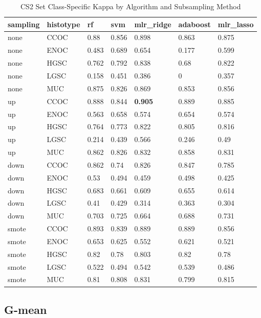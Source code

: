 \documentclass[
]{report}
\begin{document}
\begin{table}

\caption{\label{tab:cs2-kappa-class-table}CS2 Set Class-Specific Kappa by Algorithm and Subsampling Method}
\centering
\begin{tabular}[t]{l|l|l|l|l|l|l}
\hline
sampling & histotype & rf & svm & mlr\_ridge & adaboost & mlr\_lasso\\
\hline
none & CCOC & 0.88 & 0.856 & 0.898 & 0.863 & 0.875\\
\hline
none & ENOC & 0.483 & 0.689 & 0.654 & 0.177 & 0.599\\
\hline
none & HGSC & 0.762 & 0.792 & 0.838 & 0.68 & 0.822\\
\hline
none & LGSC & 0.158 & 0.451 & 0.386 & 0 & 0.357\\
\hline
none & MUC & 0.875 & 0.826 & 0.869 & 0.853 & 0.856\\
\hline
up & CCOC & 0.888 & 0.844 & \textbf{0.905} & 0.889 & 0.885\\
\hline
up & ENOC & 0.563 & 0.658 & 0.574 & 0.654 & 0.574\\
\hline
up & HGSC & 0.764 & 0.773 & 0.822 & 0.805 & 0.816\\
\hline
up & LGSC & 0.214 & 0.439 & 0.566 & 0.246 & 0.49\\
\hline
up & MUC & 0.862 & 0.826 & 0.832 & 0.858 & 0.831\\
\hline
down & CCOC & 0.862 & 0.74 & 0.826 & 0.847 & 0.785\\
\hline
down & ENOC & 0.53 & 0.494 & 0.459 & 0.498 & 0.425\\
\hline
down & HGSC & 0.683 & 0.661 & 0.609 & 0.655 & 0.614\\
\hline
down & LGSC & 0.41 & 0.429 & 0.314 & 0.363 & 0.304\\
\hline
down & MUC & 0.703 & 0.725 & 0.664 & 0.688 & 0.731\\
\hline
smote & CCOC & 0.893 & 0.839 & 0.889 & 0.889 & 0.856\\
\hline
smote & ENOC & 0.653 & 0.625 & 0.552 & 0.621 & 0.521\\
\hline
smote & HGSC & 0.82 & 0.78 & 0.803 & 0.82 & 0.78\\
\hline
smote & LGSC & 0.522 & 0.494 & 0.542 & 0.539 & 0.486\\
\hline
smote & MUC & 0.81 & 0.808 & 0.831 & 0.799 & 0.815\\
\hline
\end{tabular}
\end{table}

\hypertarget{g-mean-3}{%
\subsection{G-mean}\label{g-mean-3}}
\end{document}
